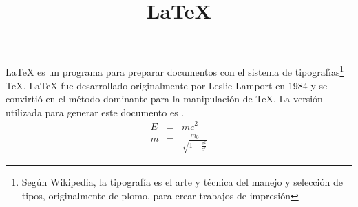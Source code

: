 \documentclass[12pt]{article}
\title{\LaTeX}
\date{}
\begin{document}
  \maketitle \LaTeX{} es un programa para preparar documentos con 
  el sistema de tipograf\'{\i}as\footnote{%
               Seg\'{u}n Wikipedia, la tipograf\'{i}a es el arte y t\'{e}cnica del manejo y selecci\'{o}n de tipos, 
originalmente de plomo, para crear trabajos de impresi\'{o}n } %
  \TeX{}. \LaTeX{} fue desarrollado originalmente por Leslie Lamport 
  en 1984 y se convirti\'o en el m\'etodo dominante para la 
  manipulaci\'on de \TeX. La versi\'on utilizada para generar 
  este documento es \LaTeXe.
  \newline
  \begin{align}
    E &=& mc^2                              \\
    m &=& \frac{m_0}{\sqrt{1-\frac{v^2}{c^2}}}
  \end{align}
\end{document}
